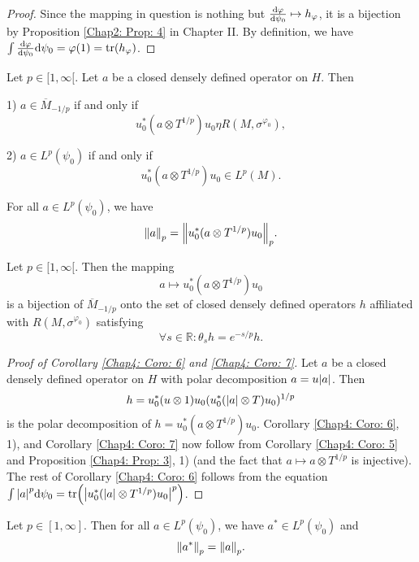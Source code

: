 \begin{proof}
    Since the mapping in question is nothing but $\dv{\varphi}{\psi_0}\mapsto h_\varphi$, it is a bijection by Proposition \ref{Chap2: Prop: 4} in Chapter II. By definition, we have $\int \dv{\varphi}{\psi_0}\dd \psi_0=\varphi(1)=\tr(h_\varphi)$.
\end{proof}
\begin{corollary}\label{Chap4: Coro: 6}
    Let $p\in [1,\infty[$. Let $a$ be a closed densely defined operator on $H$. Then\par
    1) $a\in \overline{M}_{-1/p}$ if and only if
    \[
        u_0^*(a\otimes T^{1/p})u_0\eta R(M,\sigma^{\varphi_0}),
    \]\par
    2) $a\in L^p(\psi_0)$ if and only if
    \[
        u_0^*(a\otimes T^{1/p})u_0\in L^p(M).
    \]\par
    For all $a\in L^p(\psi_0)$, we have
    \[
        \norm{a}_p=\norm{u_0^*(a\otimes T^{1/p})u_0}_p.
    \]
\end{corollary}
\begin{corollary}\label{Chap4: Coro: 7}
    Let $p\in [1,\infty[$. Then the mapping
    \begin{equation}
        a\mapsto u_0^*(a\otimes T^{1/p})u_0
    \end{equation}
    is a bijection of $\overline{M}_{-1/p}$ onto the set of closed densely defined operators $h$ affiliated with $R(M,\sigma^{\varphi_0})$ satisfying
    \begin{equation}
        \forall s\in \mathbb{R}:\theta_s h=e^{-s/p}h.
    \end{equation}
\end{corollary}
\begin{proof}[Proof of Corollary \ref{Chap4: Coro: 6} and \ref{Chap4: Coro: 7}]
    Let $a$ be a closed densely defined operator on $H$ with polar decomposition $a=u\abs{a}$. Then
    \[
        h=u_0^*(u\otimes 1)u_0(u_0^*(\abs{a}\otimes T)u_0)^{1/p}
    \]
    is the polar decomposition of $h = u_0^*(a\otimes T^{1/p})u_0$. Corollary \ref{Chap4: Coro: 6}, 1), and Corollary \ref{Chap4: Coro: 7} now follow from Corollary \ref{Chap4: Coro: 5} and Proposition \ref{Chap4: Prop: 3}, 1) (and the fact that $a\mapsto a\otimes T^{1/p}$ is injective). The rest of Corollary \ref{Chap4: Coro: 6} follows from the equation $\int\abs{a}^p \dd \psi_0=\tr(\abs{u_0^*(\abs{a}\otimes T^{1/p})u_0}^p)$.
\end{proof}
\begin{proposition}\label{Chap4: Prop: 8}
    Let $p\in [1,\infty]$. Then for all $a\in L^p(\psi_0)$, we have $a^*\in L^p(\psi_0)$ and
    \[
        \norm{a^*}_p=\norm{a}_p.
    \]
\end{proposition}
